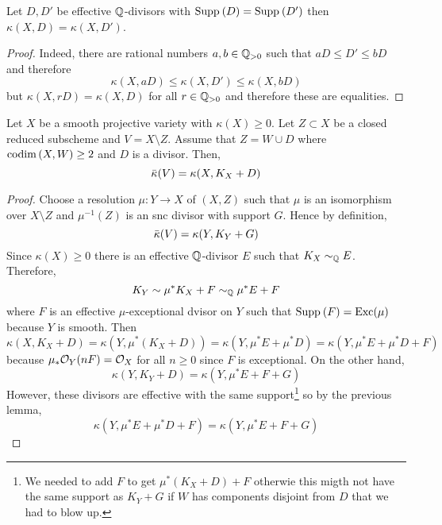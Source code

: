 \documentclass[12pt]{article}
\DeclareMathOperator{\Exc}{\mathrm{Exc}}
\begin{document}
\begin{lemma}
Let $D, D'$ be effective $\mathbb{Q}$-divisors with $\mathrm{Supp}_{}\left(D \right) = \mathrm{Supp}_{}\left(D' \right)$ then $\kappa(X, D) = \kappa(X, D')$. 
\end{lemma}

\begin{proof}
Indeed, there are rational numbers $a,b \in \mathbb{Q}_{>0}$ such that $a D \le D' \le b D$ and therefore
\[ \kappa(X, a D) \le \kappa(X, D') \le \kappa(X, b D) \]
but $\kappa(X, r D) = \kappa(X, D)$ for all $r \in \mathbb{Q}_{>0}$ and therefore these are equalities. 
\end{proof}

\begin{lemma}
Let $X$ be a smooth projective variety with $\kappa(X) \ge 0$. Let $Z \subset X$ be a closed reduced subscheme and $V = X \setminus Z$. Assume that $Z = W \cup D$ where $\mathrm{codim}\left( X, W \right) \ge 2$ and $D$ is a divisor. Then,
\[ \bar{\kappa}(V) = \kappa(X, K_X + D) \]
\end{lemma}

\begin{proof}
Choose a resolution $\mu : Y \to X$ of $(X, Z)$ such that $\mu$ is an isomorphism over $X \setminus Z$ and $\mu^{-1}(Z)$ is an snc divisor with support $G$. Hence by definition,
\[ \bar{\kappa}(V) = \kappa(Y, K_Y + G) \]
Since $\kappa(X) \ge 0$ there is an effective $\mathbb{Q}$-divisor $E$ such that $K_X \sim_{\mathbb{Q}} E$. Therefore,
\[ K_Y \sim \mu^* K_X + F \sim_{\mathbb{Q}} \mu^* E + F \]
where $F$ is an effective $\mu$-exceptional dvisor on $Y$ such that $\Supp{}{F} = \Exc(\mu)$ because $Y$ is smooth. Then
\[ \kappa(X, K_X + D) = \kappa(Y, \mu^* (K_X + D)) = \kappa(Y, \mu^* E + \mu^* D) = \kappa(Y, \mu^* E + \mu^* D + F) \]
because $\mu_* \mathcal{O}_{Y}(n F) = \mathcal{O}_{X}$ for all $n \ge 0$ since $F$ is exceptional. On the other hand,
\[ \kappa(Y, K_Y + D) = \kappa(Y, \mu^* E + F + G) \]
However, these divisors are effective with the same support\footnote{We needed to add $F$ to get $\mu^* (K_X + D) + F$ otherwie this migth not have the same support as $K_Y + G$ if $W$ has components disjoint from $D$ that we had to blow up.} so by the previous lemma,
\[ \kappa(Y, \mu^* E + \mu^*D + F) = \kappa(Y, \mu^* E + F + G) \]
\end{proof}
\end{document}
